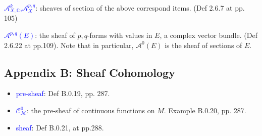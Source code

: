 \documentclass{book}
\numberwithin{equation}{subsection} %
\theoremstyle{definition}
\begin{document}
    \textcolor{blue}{$\mathcal{A}^k_{X,\mathbb{C}}$,$\mathcal{A}^{p,q}_X$}: sheaves of section of the above correspond items. (Def 2.6.7 at pp. 105)
    
    \textcolor{blue}{$\mathcal{A}^{p,q}(E)$}: the sheaf of $p,q$-forms with values in $E$, a complex vector bundle. (Def 2.6.22 at pp.109). Note that in particular, $\mathcal{A}^0(E)$ is the sheaf of sections of $E$.

	\subsection{Appendix B: Sheaf Cohomology}
	
	\begin{itemize}
		\item
		\textcolor{blue}{pre-sheaf}: Def B.0.19, pp. 287.
		
		\item
		\textcolor{blue}{$\mathcal{C^0_M}$}: the pre-sheaf of continuous functions on $M$. Example B.0.20, pp. 287.
		
		\item
		\textcolor{blue}{sheaf}: Def B.0.21, at pp.288.
		

\end{itemize}
\end{document}
